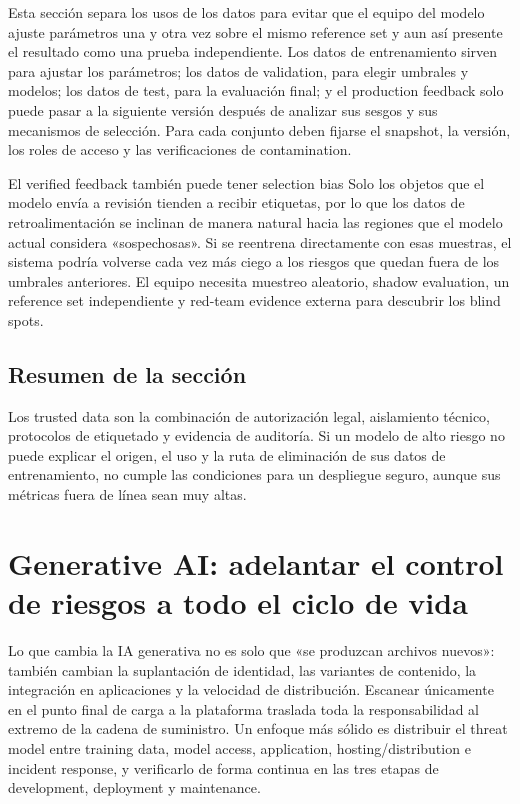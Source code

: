 \documentclass[a4paper]{article}
\begin{document}
Esta sección separa los usos de los datos para evitar que el equipo del modelo ajuste parámetros una y otra vez sobre el mismo reference set y aun así presente el resultado como una prueba independiente. Los datos de entrenamiento sirven para ajustar los parámetros; los datos de validation, para elegir umbrales y modelos; los datos de test, para la evaluación final; y el production feedback solo puede pasar a la siguiente versión después de analizar sus sesgos y sus mecanismos de selección. Para cada conjunto deben fijarse el snapshot, la versión, los roles de acceso y las verificaciones de contamination.

\begin{warningbox}{El verified feedback también puede tener selection bias}
Solo los objetos que el modelo envía a revisión tienden a recibir etiquetas, por lo que los datos de retroalimentación se inclinan de manera natural hacia las regiones que el modelo actual considera «sospechosas». Si se reentrena directamente con esas muestras, el sistema podría volverse cada vez más ciego a los riesgos que quedan fuera de los umbrales anteriores. El equipo necesita muestreo aleatorio, shadow evaluation, un reference set independiente y red-team evidence externa para descubrir los blind spots.
\end{warningbox}

\subsection{Resumen de la sección}

Los trusted data son la combinación de autorización legal, aislamiento técnico, protocolos de etiquetado y evidencia de auditoría. Si un modelo de alto riesgo no puede explicar el origen, el uso y la ruta de eliminación de sus datos de entrenamiento, no cumple las condiciones para un despliegue seguro, aunque sus métricas fuera de línea sean muy altas.
\section{Generative AI: adelantar el control de riesgos a todo el ciclo de vida}

Lo que cambia la IA generativa no es solo que «se produzcan archivos nuevos»: también cambian la suplantación de identidad, las variantes de contenido, la integración en aplicaciones y la velocidad de distribución. Escanear únicamente en el punto final de carga a la plataforma traslada toda la responsabilidad al extremo de la cadena de suministro. Un enfoque más sólido es distribuir el threat model entre training data, model access, application, hosting/distribution e incident response, y verificarlo de forma continua en las tres etapas de development, deployment y maintenance.
\end{document}
